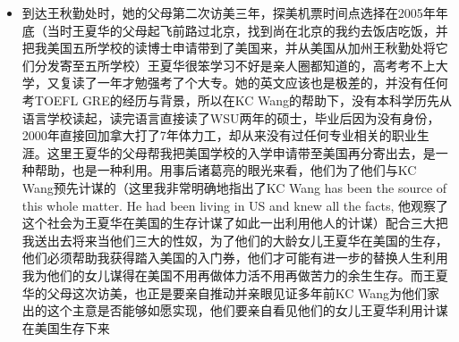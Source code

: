 \documentclass[9pt, b5paper]{article}
\begin{document}
\begin{itemize}
\begin{itemize}
\begin{itemize}
\item 到达王秋勤处时，她的父母第二次访美三年，探美机票时间点选择在2005年年底（当时王夏华的父母起飞前路过北京，找到尚在北京的我约去饭店吃饭，并把我美国五所学校的读博士申请带到了美国来，并从美国从加州王秋勤处将它们分发寄至五所学校）王夏华很笨学习不好是亲人圈都知道的，高考考不上大学，又复读了一年才勉强考了个大专。她的英文应该也是极差的，并没有任何考TOEFL GRE的经历与背景，所以在KC Wang的帮助下，没有本科学历先从语言学校读起，读完语言直接读了WSU两年的硕士，毕业后因为没有身份，2000年直接回加拿大打了7年体力工，却从来没有过任何专业相关的职业生涯。这里王夏华的父母帮我把美国学校的入学申请带至美国再分寄出去，是一种帮助，也是一种利用。用事后诸葛亮的眼光来看，他们为了他们与KC Wang预先计谋的（这里我非常明确地指出了KC Wang has been the source of this whole matter. He had been living in US and knew all the facts, 他观察了这个社会为王夏华在美国的生存计谋了如此一出利用他人的计谋）配合三大把我送出去将来当他们三大的性奴，为了他们的大龄女儿王夏华在美国的生存，他们必须帮助我获得踏入美国的入门券，他们才可能有进一步的替换人生利用我为他们的女儿谋得在美国不用再做体力活不用再做苦力的余生生存。而王夏华的父母这次访美，也正是要亲自推动并亲眼见证多年前KC Wang为他们家出的这个主意是否能够如愿实现，他们要亲自看见他们的女儿王夏华利用计谋在美国生存下来

\end{itemize}
\end{itemize}
\end{itemize}
\end{document}
